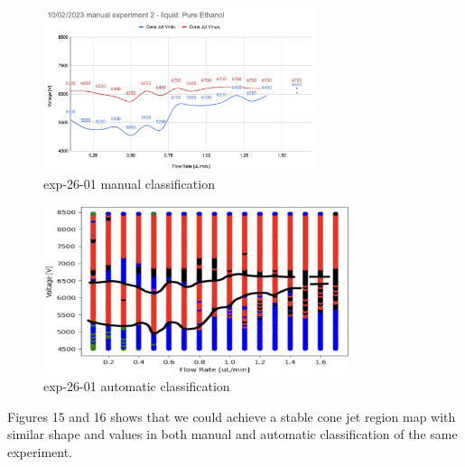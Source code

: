     \begin{multicols}{2}


        \begin{figure}[H]
            \center
            \includegraphics[width=8cm]{Figuras/april/results_map_1.png}
            \caption{ exp-26-01 manual classification}
        \end{figure}

        \begin{figure}[H]
            \center
            \includegraphics[width=9cm]{Figuras/april/results_map_2.png}
            \caption{ exp-26-01 automatic classification}
        \end{figure}

    \end{multicols}

    Figures 15 and 16 shows that we could achieve a stable cone jet region map with similar shape and values in both manual and automatic classification of the same experiment.


